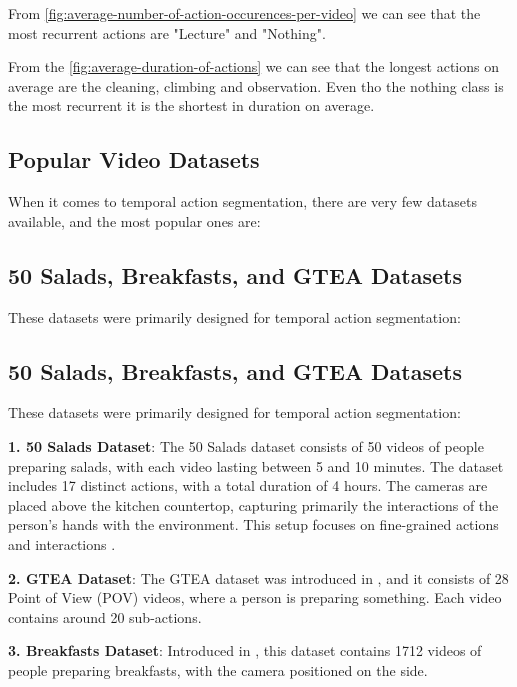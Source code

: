 From \ref{fig:average-number-of-action-occurences-per-video} we  can see that the most recurrent actions are "Lecture" and "Nothing".

From the \ref{fig:average-duration-of-actions} we can see that the longest actions on average are the cleaning, climbing and observation. Even tho the nothing class is the most recurrent it is the shortest in duration on average.


\subsection{Popular Video Datasets}
\label{subsection:popular-video-datasets}

When it comes to temporal action segmentation, there are very few datasets available, and the most popular ones are:

\subsection*{50 Salads, Breakfasts, and GTEA Datasets}
These datasets were primarily designed for temporal action segmentation:

\subsection*{50 Salads, Breakfasts, and GTEA Datasets}
These datasets were primarily designed for temporal action segmentation:

\textbf{1. 50 Salads Dataset}: The 50 Salads dataset consists of 50 videos of people preparing salads, with each video lasting between 5 and 10 minutes. The dataset includes 17 distinct actions, with a total duration of 4 hours. The cameras are placed above the kitchen countertop, capturing primarily the interactions of the person's hands with the environment. This setup focuses on fine-grained actions and interactions \cite{50salads-dataset}.

\textbf{2. GTEA Dataset}: The GTEA dataset was introduced in \cite{gtea-dataset}, and it consists of 28 Point of View (POV) videos, where a person is preparing something. Each video contains around 20 sub-actions.

\textbf{3. Breakfasts Dataset}: Introduced in \cite{breakfast-dataset}, this dataset contains 1712 videos of people preparing breakfasts, with the camera positioned on the side.

